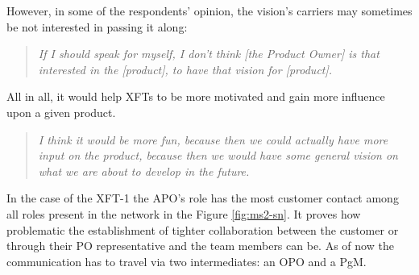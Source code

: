 \begin{description}
   However, in some of the respondents' opinion, the vision's carriers may sometimes be not interested in passing it along:

      \begin{quote}\itshape If I should speak for myself, I don't think [the Product Owner] is that interested in the [product], to have that vision for [product].
      \end{quote}
   
   All in all, it would help \acp{XFT} to be more motivated and gain more influence upon a given product.
   
      \begin{quote}\itshape I think it would be more fun, because then we could actually have more input on the product, because then we would have some general vision on what we are about to develop in the future.
      \end{quote}
      
In the case of the \ac{XFT}-1 the \ac{APO}'s role has the most customer contact among all roles present in the network in the Figure \ref{fig:ms2-sn}. It proves how problematic the establishment of tighter collaboration between the customer or through their \ac{PO} representative and the team members can be. As of now the communication has to travel via two intermediates: an \ac{OPO} and a \ac{PgM}.

\end{description}
